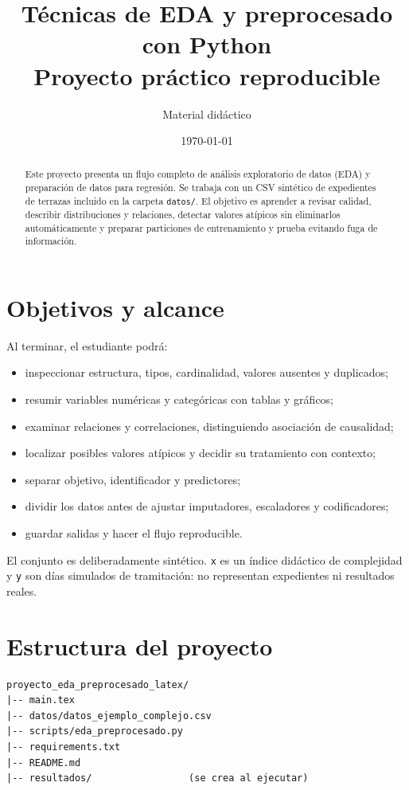 \documentclass[11pt,a4paper]{article}
\title{\Huge Técnicas de EDA y preprocesado con Python\\[0.4em]\Large Proyecto práctico reproducible}
\author{Material didáctico}
\date{\today}
\begin{document}
\maketitle
\begin{abstract}
Este proyecto presenta un flujo completo de análisis exploratorio de datos (EDA) y preparación de datos para regresión. Se trabaja con un CSV sintético de expedientes de terrazas incluido en la carpeta \texttt{datos/}. El objetivo es aprender a revisar calidad, describir distribuciones y relaciones, detectar valores atípicos sin eliminarlos automáticamente y preparar particiones de entrenamiento y prueba evitando fuga de información.
\end{abstract}
\tableofcontents
\newpage
\section{Objetivos y alcance}
Al terminar, el estudiante podrá:
\begin{itemize}[nosep]
\item inspeccionar estructura, tipos, cardinalidad, valores ausentes y duplicados;
\item resumir variables numéricas y categóricas con tablas y gráficos;
\item examinar relaciones y correlaciones, distinguiendo asociación de causalidad;
\item localizar posibles valores atípicos y decidir su tratamiento con contexto;
\item separar objetivo, identificador y predictores;
\item dividir los datos antes de ajustar imputadores, escaladores y codificadores;
\item guardar salidas y hacer el flujo reproducible.
\end{itemize}
El conjunto es deliberadamente sintético. \texttt{x} es un índice didáctico de complejidad y \texttt{y} son días simulados de tramitación: no representan expedientes ni resultados reales.
\section{Estructura del proyecto}
\begin{verbatim}
proyecto_eda_preprocesado_latex/
|-- main.tex
|-- datos/datos_ejemplo_complejo.csv
|-- scripts/eda_preprocesado.py
|-- requirements.txt
|-- README.md
|-- resultados/                 (se crea al ejecutar)
\end{verbatim}
\end{document}
